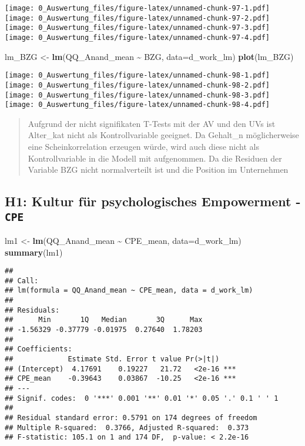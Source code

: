 \documentclass[
]{article}
\newenvironment{Shaded}{\begin{snugshade}}{\end{snugshade}}
\newcommand{\AttributeTok}[1]{\textcolor[rgb]{0.13,0.29,0.53}{#1}}
\newcommand{\FunctionTok}[1]{\textcolor[rgb]{0.13,0.29,0.53}{\textbf{#1}}}
\newcommand{\NormalTok}[1]{#1}
\newcommand{\OtherTok}[1]{\textcolor[rgb]{0.56,0.35,0.01}{#1}}
\newcommand{\SpecialCharTok}[1]{\textcolor[rgb]{0.81,0.36,0.00}{\textbf{#1}}}
\begin{document}
\texttt{[image: 0\_Auswertung\_files/figure-latex/unnamed-chunk-97-1.pdf]}
\texttt{[image: 0\_Auswertung\_files/figure-latex/unnamed-chunk-97-2.pdf]}
\texttt{[image: 0\_Auswertung\_files/figure-latex/unnamed-chunk-97-3.pdf]}
\texttt{[image: 0\_Auswertung\_files/figure-latex/unnamed-chunk-97-4.pdf]}

\begin{Shaded}
\begin{Highlighting}[]
\NormalTok{lm\_BZG }\OtherTok{\textless{}{-}} \FunctionTok{lm}\NormalTok{(QQ\_Anand\_mean }\SpecialCharTok{\textasciitilde{}}\NormalTok{ BZG, }\AttributeTok{data=}\NormalTok{d\_work\_lm)}
\FunctionTok{plot}\NormalTok{(lm\_BZG)}
\end{Highlighting}
\end{Shaded}

\texttt{[image: 0\_Auswertung\_files/figure-latex/unnamed-chunk-98-1.pdf]}
\texttt{[image: 0\_Auswertung\_files/figure-latex/unnamed-chunk-98-2.pdf]}
\texttt{[image: 0\_Auswertung\_files/figure-latex/unnamed-chunk-98-3.pdf]}
\texttt{[image: 0\_Auswertung\_files/figure-latex/unnamed-chunk-98-4.pdf]}

\begin{quote}
Aufgrund der nicht signifikaten T-Tests mit der AV und den UVs ist
Alter\_kat nicht als Kontrollvariable geeignet. Da Gehalt\_n
möglicherweise eine Scheinkorrelation erzeugen würde, wird auch diese
nicht als Kontrollvariable in die Modell mit aufgenommen. Da die
Residuen der Variable BZG nicht normalverteilt ist und die Position im
Unternehmen
\end{quote}

\subsection{\texorpdfstring{H1: Kultur für psychologisches Empowerment -
\texttt{CPE}}{H1: Kultur für psychologisches Empowerment - CPE}}\label{h1-kultur-fuxfcr-psychologisches-empowerment---cpe}

\begin{Shaded}
\begin{Highlighting}[]
\NormalTok{lm1 }\OtherTok{\textless{}{-}} \FunctionTok{lm}\NormalTok{(QQ\_Anand\_mean }\SpecialCharTok{\textasciitilde{}}\NormalTok{ CPE\_mean, }\AttributeTok{data=}\NormalTok{d\_work\_lm)}
\FunctionTok{summary}\NormalTok{(lm1)}
\end{Highlighting}
\end{Shaded}

\begin{verbatim}
## 
## Call:
## lm(formula = QQ_Anand_mean ~ CPE_mean, data = d_work_lm)
## 
## Residuals:
##      Min       1Q   Median       3Q      Max 
## -1.56329 -0.37779 -0.01975  0.27640  1.78203 
## 
## Coefficients:
##             Estimate Std. Error t value Pr(>|t|)    
## (Intercept)  4.17691    0.19227   21.72   <2e-16 ***
## CPE_mean    -0.39643    0.03867  -10.25   <2e-16 ***
## ---
## Signif. codes:  0 '***' 0.001 '**' 0.01 '*' 0.05 '.' 0.1 ' ' 1
## 
## Residual standard error: 0.5791 on 174 degrees of freedom
## Multiple R-squared:  0.3766, Adjusted R-squared:  0.373 
## F-statistic: 105.1 on 1 and 174 DF,  p-value: < 2.2e-16
\end{verbatim}
\end{document}
